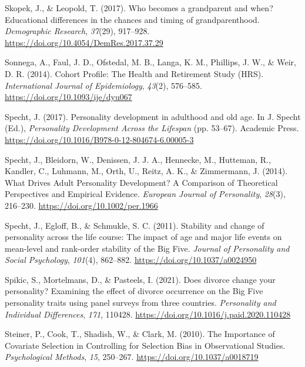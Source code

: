 \documentclass[
  english,
  man,floatsintext]{apa7}
\begin{document}
\leavevmode\hypertarget{ref-skopekWhoBecomesGrandparent2017}{}%
Skopek, J., \& Leopold, T. (2017). Who becomes a grandparent and when? Educational differences in the chances and timing of grandparenthood. \emph{Demographic Research}, \emph{37}(29), 917--928. \url{https://doi.org/10.4054/DemRes.2017.37.29}

\leavevmode\hypertarget{ref-sonnegaCohortProfileHealth2014}{}%
Sonnega, A., Faul, J. D., Ofstedal, M. B., Langa, K. M., Phillips, J. W., \& Weir, D. R. (2014). Cohort Profile: The Health and Retirement Study (HRS). \emph{International Journal of Epidemiology}, \emph{43}(2), 576--585. \url{https://doi.org/10.1093/ije/dyu067}

\leavevmode\hypertarget{ref-spechtPersonalityDevelopmentAdulthood2017}{}%
Specht, J. (2017). Personality development in adulthood and old age. In J. Specht (Ed.), \emph{Personality Development Across the Lifespan} (pp. 53--67). Academic Press. \url{https://doi.org/10.1016/B978-0-12-804674-6.00005-3}

\leavevmode\hypertarget{ref-spechtWhatDrivesAdult2014}{}%
Specht, J., Bleidorn, W., Denissen, J. J. A., Hennecke, M., Hutteman, R., Kandler, C., Luhmann, M., Orth, U., Reitz, A. K., \& Zimmermann, J. (2014). What Drives Adult Personality Development? A Comparison of Theoretical Perspectives and Empirical Evidence. \emph{European Journal of Personality}, \emph{28}(3), 216--230. \url{https://doi.org/10.1002/per.1966}

\leavevmode\hypertarget{ref-spechtStabilityChangePersonality2011}{}%
Specht, J., Egloff, B., \& Schmukle, S. C. (2011). Stability and change of personality across the life course: The impact of age and major life events on mean-level and rank-order stability of the Big Five. \emph{Journal of Personality and Social Psychology}, \emph{101}(4), 862--882. \url{https://doi.org/10.1037/a0024950}

\leavevmode\hypertarget{ref-spikicDoesDivorceChange2021}{}%
Spikic, S., Mortelmans, D., \& Pasteels, I. (2021). Does divorce change your personality? Examining the effect of divorce occurrence on the Big Five personality traits using panel surveys from three countries. \emph{Personality and Individual Differences}, \emph{171}, 110428. \url{https://doi.org/10.1016/j.paid.2020.110428}

\leavevmode\hypertarget{ref-steinerImportanceCovariateSelection2010}{}%
Steiner, P., Cook, T., Shadish, W., \& Clark, M. (2010). The Importance of Covariate Selection in Controlling for Selection Bias in Observational Studies. \emph{Psychological Methods}, \emph{15}, 250--267. \url{https://doi.org/10.1037/a0018719}
\end{document}
